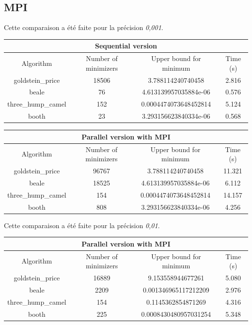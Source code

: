 \documentclass[a4paper,10pt]{article}
\begin{document}
\subsection{MPI}

Cette comparaison a été faite pour la précision \emph{0,001}.

\begin{tabular}{|c|c|c|c|}
\hline
\multicolumn{4}{|c|}{Sequential version}\\
\hline
Algorithm & Number of minimizers & Upper bound for minimum & Time (s) \\
\hline
goldstein\_price & 18506 & 3.788114240740458 & 2.816\\
\hline
beale & 76 & 4.613139957035884e-06 & 0.576\\
\hline
three\_hump\_camel & 152 & 0.0004474073648452814 & 5.124\\
\hline
booth & 23 & 3.293156623840334e-06 & 0.568\\
\hline
\end{tabular}

\begin{tabular}{|c|c|c|c|}
\hline
\multicolumn{4}{|c|}{Parallel version with MPI}\\
\hline
Algorithm & Number of minimizers & Upper bound for minimum & Time (s) \\
\hline
goldstein\_price & 96767 & 3.788114240740458 & 11.321\\
\hline
beale & 18525 & 4.613139957035884e-06 & 6.112\\
\hline
three\_hump\_camel & 154 & 0.0004474073648452814 & 14.157\\
\hline
booth & 808 & 3.293156623840334e-06 & 4.256\\
\hline
\end{tabular}

Cette comparaison a été faite pour la précision \emph{0,01}.

\begin{tabular}{|c|c|c|c|}
\hline
\multicolumn{4}{|c|}{Parallel version with MPI}\\
\hline
Algorithm & Number of minimizers & Upper bound for minimum & Time (s) \\
\hline
goldstein\_price & 16889 & 9.153558944677261 & 5.080\\
\hline
beale & 2209 & 0.001346965117212209 & 2.976\\
\hline
three\_hump\_camel & 154 & 0.1145362854871269 & 4.316\\
\hline
booth & 225 & 0.0008430480957031254 & 5.348\\
\hline
\end{tabular}
\end{document}
